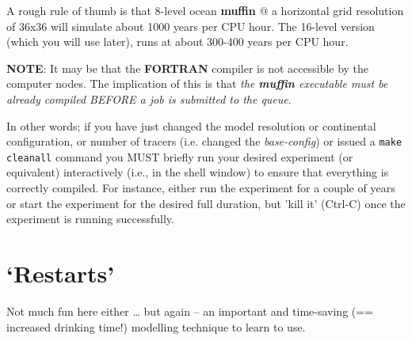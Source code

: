 \documentclass[11pt,fleqn]{book} %
\begin{document}
\newpage 

A rough rule of thumb is that 8-level ocean \textbf{muffin} @ a horizontal grid resolution of 36x36 will simulate about 1000 years per CPU hour. The 16-level version (which you will use later), runs at about 300-400 years per CPU hour.

\noindent \textbf{NOTE}: It may be that the \textbf{FORTRAN} compiler is not accessible by the computer nodes. The implication of this is that \textit{the \textbf{muffin} executable must be already compiled BEFORE a job is submitted to the queue}.

\noindent In other words; if you have just changed the model resolution or continental configuration, or number of tracers (i.e. changed the \textit{base-config}) or issued a \texttt{make cleanall} command you MUST briefly run your desired experiment (or equivalent) interactively (i.e., in the shell window) to ensure that everything is correctly compiled. For instance, either run the experiment for a couple of years or start the experiment for the desired full duration, but 'kill it' (\textsf{\small Ctrl-C}) once the experiment is running successfully.


\newpage


\section{‘Restarts’}

Not much fun here either … but again – an important and time-saving (== increased drinking time!) modelling technique to learn to use.
\end{document}
